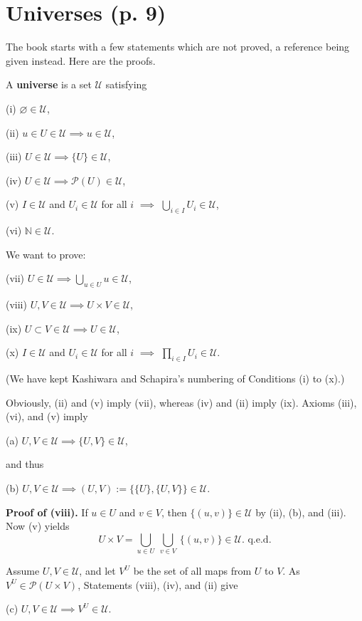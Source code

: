 \documentclass[12pt]{article}
\theoremstyle{remark}%
\newcommand{\n}{\noindent}
\begin{document}
\section{Universes (p. 9)}%
%
The book starts with a few statements which are not proved, a reference being given instead. Here are the proofs.

A \textbf{universe} is a set $\mathcal U$ satisfying 

(i) $\varnothing\in\mathcal U$,

(ii) $u\in U\in\mathcal U\implies u\in \mathcal U$,

(iii) $U\in\mathcal U\implies\{U\}\in\mathcal U$,

(iv) $U\in\mathcal U\implies\mathcal P(U)\in\mathcal U$,

(v) $I\in\mathcal U$ and $U_i\in\mathcal U$ for all $i$ $\implies$ $\bigcup_{i\in I}U_i\in\mathcal U$,

(vi) $\mathbb N\in\mathcal U$.

\n We want to prove:

(vii) $U\in\mathcal U\implies\bigcup_{u\in U}u\in\mathcal U$,

(viii) $U,V\in\mathcal U\implies U\times V\in\mathcal U$,

(ix) $U\subset V\in\mathcal U\implies U\in\mathcal U$,

(x) $I\in \mathcal U$ and $U_i\in\mathcal U$ for all $i$ $\implies$ $\prod_{i\in I}U_i\in\mathcal U$.

\n(We have kept Kashiwara and Schapira's numbering of Conditions (i) to (x).) 

\n Obviously, (ii) and (v) imply (vii), whereas (iv) and (ii) imply (ix). Axioms (iii), (vi), and (v) imply

(a) $U,V\in\mathcal U\implies\{U,V\}\in\mathcal U$,

\n and thus

(b) $U,V\in\mathcal U\implies(U,V):=\{\{U\},\{U,V\}\}\in\mathcal U$.

\n\textbf{Proof of (viii).} If $u\in U$ and $v\in V$, then $\{(u,v)\}\in\mathcal U$ by (ii), (b), and (iii). Now (v) yields 
$$
U\times V=\bigcup_{u\in U}\ \bigcup_{v\in V}\ \{(u,v)\}\in\mathcal U.\text{ q.e.d.} 
$$ 

Assume $U,V\in\mathcal U$, and let $V^U$ be the set of all maps from $U$ to $V$. As $V^U\in\mathcal P(U\times V)$, Statements (viii), (iv), and (ii) give

(c) $U,V\in\mathcal U\implies V^U\in\mathcal U$. 
\end{document}
